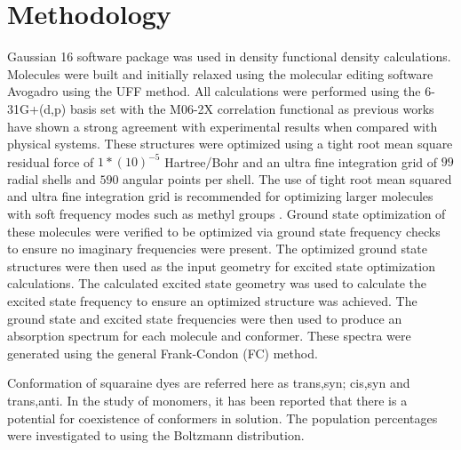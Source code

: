 \documentclass[journal=jacsat,manuscript=article]{achemso}
\begin{document}
\section{Methodology}
Gaussian 16 software package\cite{M.J.FrischG.W.Trucks2016Gaussian09}⁠ was used in density functional density calculations. Molecules were built and initially relaxed using the molecular editing software Avogadro\cite{Hanwell2012Avogadro:Platform}⁠ using the UFF\cite{Rappe1992UFFSimulations}⁠ method. All calculations were performed using the 6-31G+(d,p) basis set with the M06-2X\cite{Zhao2008TheFunction}⁠ correlation functional as previous works have shown a strong agreement with experimental results when compared with physical systems\cite{Jacquemin2016Excited-StateCC2}. These structures were optimized using a tight root mean square residual force of $1*(10)^{-5}$  Hartree$⁄$Bohr and an ultra fine integration grid of $99$ radial shells and $590$ angular points per shell. The use of tight root mean squared and ultra fine integration grid is recommended for optimizing larger molecules with soft frequency modes such as methyl groups\cite{AzaisTestingSuper-Resolution}⁠ . Ground state optimization of these molecules were verified to be optimized via ground state frequency checks to ensure no imaginary frequencies were present. The optimized ground state structures were then used as the input geometry for excited state optimization calculations. The calculated excited state geometry was used to calculate the excited state frequency to ensure an optimized structure was achieved.  The ground state and excited state frequencies were then used to produce an absorption spectrum for each molecule and conformer. These spectra were generated using the general Frank-Condon (FC) method. 

Conformation of squaraine dyes are referred here as trans,syn; cis,syn and trans,anti. In the study of monomers, it has been reported that there is a potential for coexistence of conformers in solution\cite{Kolosova2019MolecularSquaraines}⁠. The population percentages were investigated to using the Boltzmann distribution. 
\end{document}
